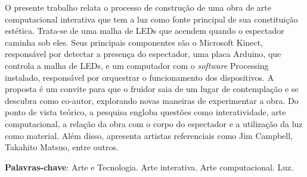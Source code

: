 \begin{RESUMO}
\thispagestyle{empty}
	\begin{SingleSpace}
	
		\hspace{-1.3 cm}O presente trabalho relata o processo de construção de uma obra de arte computacional interativa que tem a luz como fonte principal de sua constituição estética. Trata-se de uma malha de LEDs que acendem quando o espectador caminha sob eles. Seus principais componentes são o Microsoft Kinect, responsável por detectar a presença do espectador, uma placa Arduino, que controla a malha de LEDs, e um computador com o \textit{software} Processing instalado, responsável por orquestrar o funcionamento dos dispositivos. A proposta é um convite para que o fruidor saia de um lugar de contemplação e se descubra como co-autor, explorando novas maneiras de experimentar a obra. Do ponto de vista teórico, a pesquisa engloba questões como interatividade, arte computacional, a relação da obra com o corpo do espectador e a utilização da luz como material. Além disso, apresenta artistas referenciais como Jim Campbell, Takahito Matsuo, entre outros.
		
		\vspace*{0.5cm}\hspace{-1.3 cm}\textbf{Palavras-chave}: Arte e Tecnologia. Arte interativa. Arte computacional. Luz.
		
	\end{SingleSpace}
\end{RESUMO}


